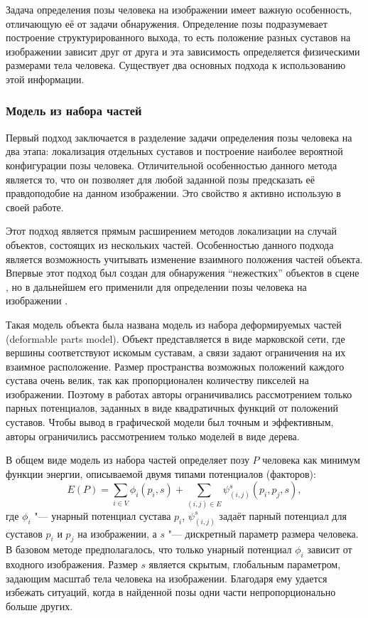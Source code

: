Задача определения позы человека на изображении имеет важную особенность, отличающую её от задачи обнаружения. Определение позы подразумевает построение структурированного выхода, то есть положение разных суставов на изображении зависит друг от друга и эта зависимость определяется физическими размерами тела человека. Существует два основных подхода к использованию этой информации.

\subsubsection{Модель из набора частей}

Первый подход заключается в разделение задачи определения позы человека на два этапа: локализация отдельных суставов и построение наиболее вероятной конфигурации позы человека. Отличительной особенностью данного метода является то, что он позволяет для любой заданной позы предсказать её правдоподобие на данном изображении. Это свойство я активно использую в своей работе.

Этот подход является прямым расширением методов локализации на случай объектов, состоящих из нескольких частей. Особенностью данного подхода является возможность учитывать изменение взаимного положения частей объекта. Впервые этот подход был создан для обнаружения ``нежестких'' объектов в сцене \cite{felzenszwalb2008discriminatively}, но в дальнейшем его применили для определении позы человека на изображении \cite{yang2011articulated}.

Такая модель объекта была названа модель из набора деформируемых частей (deformable parts model). Объект представляется в виде марковской сети, где вершины соответствуют искомым суставам, а связи задают ограничения на их взаимное расположение. Размер пространства возможных положений каждого сустава очень велик, так как пропорционален количеству пикселей на изображении. Поэтому в работах \cite{yang2011articulated,pirsiavash2012steerable} авторы ограничивались рассмотрением только парных потенциалов, заданных в виде квадратичных функций от положений суставов. Чтобы вывод в графической модели был точным и эффективным, авторы ограничились рассмотрением только моделей в виде дерева.

В общем виде модель из набора частей определяет позу $P$ человека как минимум функции энергии, описываемой двумя типами потенциалов (факторов):
\begin{equation}
	E(P) = \sum_{i\in V}{\phi_i(p_i, s)} + \sum_{\left(i,j\right)\in E}{\psi_{(i,j)}^s(p_i, p_j, s)},
	\label{eq::rel::im_pose}
\end{equation} 
где $\phi_i$ "--- унарный потенциал сустава $p_i$, $\psi_{(i,j)}^s$ задаёт парный потенциал для суставов $p_i$ и $p_j$ на изображении, а $s$ "--- дискретный параметр размера человека. В базовом методе предполагалось, что только унарный потенциал $\phi_i$ зависит от входного изображения. Размер $s$ является скрытым, глобальным параметром, задающим масштаб тела человека на изображении. Благодаря ему удается избежать ситуаций, когда в найденной позы одни части непропорционально больше других.

